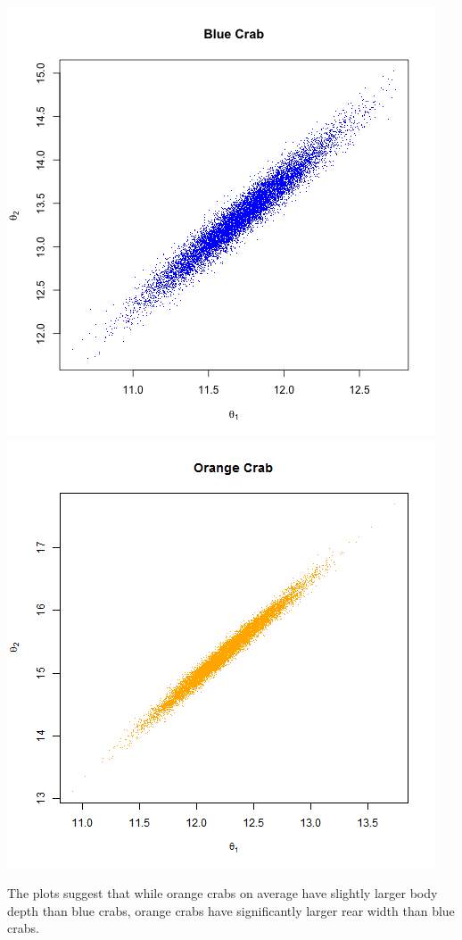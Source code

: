\documentclass{article}
\begin{document}
\begin{enumerate}[7.1]
\begin{enumerate}[(a)]
		\includegraphics[scale=0.4]{bluetheta.png}
		\includegraphics[scale=0.4]{ortheta.png}
		
		The plots suggest that while orange crabs on average have slightly larger body depth than blue crabs, orange crabs have significantly larger rear width than blue crabs.
		

\end{enumerate}
\end{enumerate}
\end{document}
